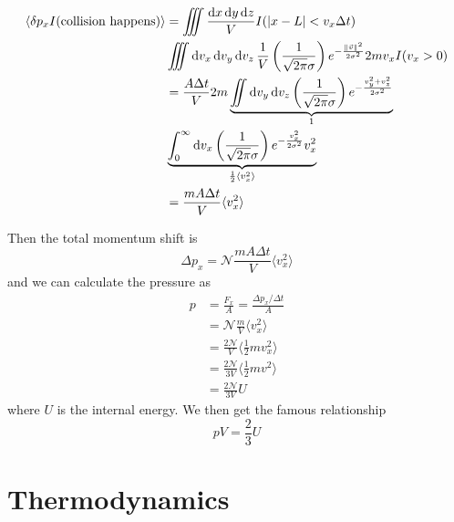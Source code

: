 \documentclass[12pt]{extarticle}
\newcommand{\anglebraces}[1]{
    \langle #1 \rangle
}
\begin{document}
\begin{align}
    \anglebraces{\delta p_x I(\text{collision happens})} & =
    \iiint \frac{\dd{x} \dd{y} \dd{z}}{V} I(\abs{x - L} < v_x \Delta t) \nonumber                                                                                                                                         \\
                                                         & \iiint \dd{v_x} \dd{v_y} \dd{v_z} \frac{1}{V} \left(\frac{1}{\sqrt{2 \pi} \sigma}\right) e^{-\frac{\norm{\vec v}^2}{2 \sigma^2}} 2 m v_x I(v_x > 0)            \\
                                                         & = \frac{A \Delta t}{V} 2m \underbrace{\iint  \dd{v_y} \dd{v_z} \left(\frac{1}{\sqrt{2 \pi} \sigma}\right) e^{-\frac{v_y^2 + v_z^2}{2 \sigma^2}}}_{1} \nonumber \\
                                                         & \underbrace{\int_0^\infty \dd{v_x} \left(\frac{1}{\sqrt{2 \pi} \sigma}\right) e^{-\frac{v_x^2 }{2 \sigma^2}}v_x^2}_{\frac{1}{2} \anglebraces{v_x^2}}           \\
                                                         & = \frac{m A \Delta t}{V} \anglebraces{v_x^2}
\end{align}

Then the total momentum shift is
\begin{equation}
    \Delta p_x = \mathscr{N} \frac{m A \Delta t}{V} \anglebraces{v_x^2}
\end{equation}
and we can calculate the pressure as
\begin{align}
    p & = \frac{F_x}{A} = \frac{\Delta p_x / \Delta t}{A}          \\
      & = \mathscr{N} \frac{m}{V} \anglebraces{v_x^2}              \\
      & = \frac{2 \mathscr{N}}{V} \anglebraces{\frac{1}{2}m v_x^2} \\
      & = \frac{2 \mathscr{N}}{3 V} \anglebraces{\frac{1}{2}m v^2} \\
      & = \frac{2 \mathscr{N}}{3 V} U
\end{align}
where $U$ is the internal energy. We then get the famous relationship
\begin{equation}
    \label{eq:gas:internal_energy}
    pV = \frac{2}{3}U
\end{equation}

\section{Thermodynamics}
\end{document}
